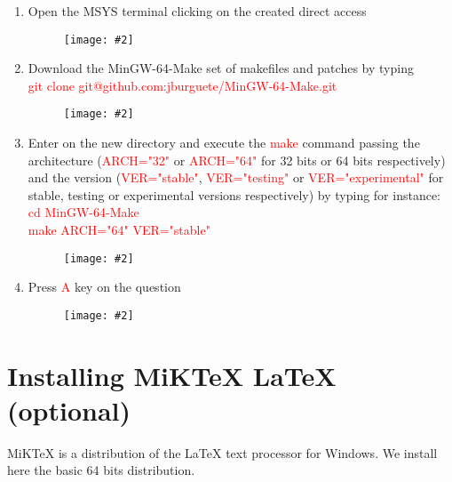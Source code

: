 \documentclass[a4paper]{article}
\newcommand{\FIG}[2]
{
	\begin{figure}[ht!]
	\centering
	\texttt{[image: \#2]}
	\end{figure}
}
\newcommand{\FIGURE}[1]{\FIG{0.35}{#1}}
\newcommand{\RED}[1] {\textcolor{red}{#1}}
\begin{document}
\begin{enumerate}

\clearpage

\item Open the MSYS terminal clicking on the created direct access
\FIGURE{mingw-1.png.eps}

\item Download the MinGW-64-Make set of makefiles and patches by typing\\
\RED{git clone git@github.com:jburguete/MinGW-64-Make.git}
\FIGURE{mingw-2.png.eps}

\clearpage

\item Enter on the new directory and execute the \RED{make} command passing the
architecture (\RED{ARCH="32"} or \RED{ARCH="64"} for 32 bits or 64 bits
respectively) and the version (\RED{VER="stable"}, \RED{VER="testing"} or
\newline\RED{VER="experimental"} for stable, testing or experimental versions
respectively) by typing for instance:\\
\RED{cd MinGW-64-Make}\\
\RED{make ARCH="64" VER="stable"}
\FIGURE{mingw-3.png.eps}

\item Press \RED{A} key on the question
\FIGURE{mingw-4.png.eps}

\end{enumerate}

\clearpage

\section{Installing MiKTeX LaTeX (optional)}

MiKTeX is a distribution of the LaTeX text processor for Windows. We install
here the basic 64 bits distribution.
\end{document}
